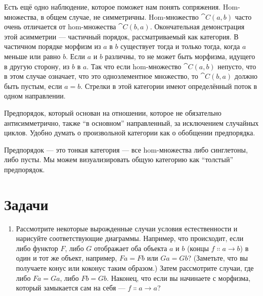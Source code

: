 Есть ещё одно наблюдение, которое поможет нам понять сопряжения.
Hom-множества, в общем случае, не симметричны. Hom-множество $\cat{C}(a, b)$
часто очень отличается от hom-множества $\cat{C}(b, a)$. Окончательная
демонстрация этой асимметрии --- частичный порядок, рассматриваемый как категория.
В частичном порядке морфизм из $a$ в $b$ существует тогда и
только тогда, когда $a$ меньше или равно $b$. Если
$a$ и $b$ различны, то не может быть морфизма,
идущего в другую сторону, из $b$ в $a$. Так что если hom-множество
$\cat{C}(a, b)$ непусто, что в этом случае означает, что это
одноэлементное множество, то $\cat{C}(b, a)$ должно быть пустым, если
$a = b$. Стрелки в этой категории имеют определённый поток в
одном направлении.

Предпорядок, который основан на отношении, которое не обязательно
антисимметрично, также ``в основном'' направленный, за исключением случайных
циклов. Удобно думать о произвольной категории как о
обобщении предпорядка.

Предпорядок --- это тонкая категория --- все hom-множества либо синглетоны, либо
пусты. Мы можем визуализировать общую категорию как ``толстый'' предпорядок.

\section{Задачи}

\begin{enumerate}
  \tightlist
  \item
        Рассмотрите некоторые вырожденные случаи условия естественности и нарисуйте
        соответствующие диаграммы. Например, что происходит, если либо функтор
        $F$, либо $G$ отображает оба объекта $a$ и $b$
        (концы $f \Colon a \to b$) в один и тот же
        объект, например, $F a = F b$ или $G a = G b$?
        (Заметьте, что вы получаете конус или коконус таким образом.) Затем рассмотрите
        случаи, где либо $F a = G a$, либо $F b = G b$.
        Наконец, что если вы начинаете с морфизма, который замыкается сам на себя ---
        $f \Colon a \to a$?
\end{enumerate}
